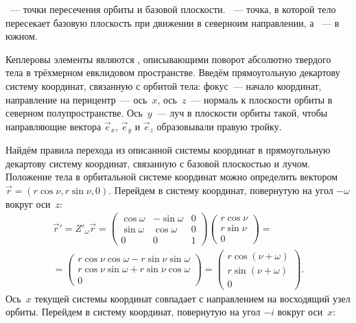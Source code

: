 ~--- точки пересечения орбиты и базовой плоскости. ~--- точка, в которой тело пересекает базовую плоскость при движении в северноим направлении, а ~--- в южном.

Кеплеровы элементы являются , описывающими поворот абсолютно твердого тела в трёхмерном евклидовом пространстве. Введём прямоугольную декартову систему координат, связанную с орбитой тела: фокус~--- начало координат, направление на перицентр~--- ось~$x$, ось~$z$~--- нормаль к плоскости орбиты в северном полупространстве. Ось~$y$~--- луч в плоскости орбиты такой, чтобы направляющие вектора $\vec e_x$, $\vec e_y$ и $\vec e_z$ образовывали правую тройку. 

Найдём правила перехода из описанной системы координат в прямоугольную декартову систему координат, связанную с базовой плоскостью и лучом. Положение тела в орбитальной системе координат можно определить вектором $\vec r = (r \cos \nu, r \sin \nu, 0)$. Перейдем в систему координат, повернутую на угол $-\omega$ вокруг оси~$z$:
\begin{multline*}
    \vec r' = Z'_\omega\vec r 
    = \begin{pmatrix}
        \cos \omega & - \sin \omega & 0\\
        \sin \omega & \cos \omega & 0\\
        0 & 0 & 1
    \end{pmatrix} \begin{pmatrix}
        r \cos \nu\\
        r \sin \nu\\
        0
    \end{pmatrix} = \\
    = \begin{pmatrix}
        r \cos \nu \cos \omega - r \sin \nu \sin \omega\\
        r \cos \nu \sin \omega + r \sin \nu \cos \omega\\
        0
    \end{pmatrix} 
    =\begin{pmatrix}
        r \cos (\nu + \omega)\\
        r \sin (\nu + \omega)\\
        0
    \end{pmatrix}.
\end{multline*}
Ось~$x$ текущей системы координат совпадает с направлением на восходящий узел орбиты. Перейдем в систему координат, повернутую на угол $-i$ вокруг оси~$x$:
